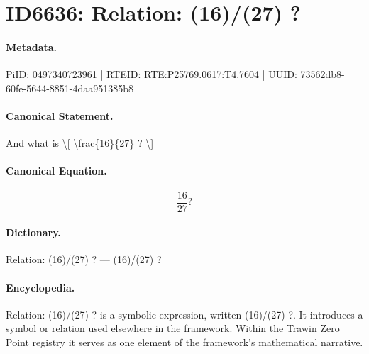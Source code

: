 \section*{ID6636: Relation: (16)/(27) ?}
\paragraph{Metadata.}
PiID: 0497340723961 | RTEID: RTE:P25769.0617:T4.7604 | UUID: 73562db8-60fe-5644-8851-4daa951385b8

\paragraph{Canonical Statement.}
And what is \textbackslash{}[ \textbackslash{}frac\{16\}\{27\} ? \textbackslash{}]

\paragraph{Canonical Equation.}
\[
\frac{16}{27} ?
\]

\paragraph{Dictionary.}
Relation: (16)/(27) ? — (16)/(27) ?

\paragraph{Encyclopedia.}
Relation: (16)/(27) ? is a symbolic expression, written (16)/(27) ?. It introduces a symbol or relation used elsewhere in the framework. Within the Trawin Zero Point registry it serves as one element of the framework's mathematical narrative.
